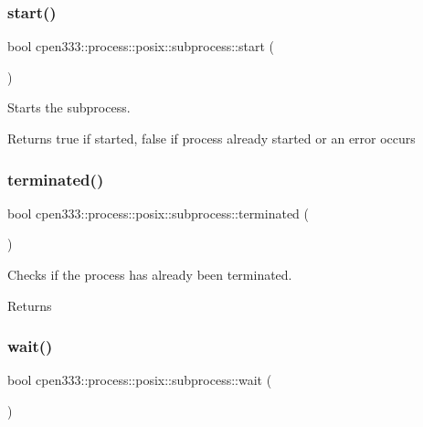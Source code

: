 \subsubsection{\texorpdfstring{start()}{start()}}
{\footnotesize\ttfamily bool cpen333\+::process\+::posix\+::subprocess\+::start (\begin{DoxyParamCaption}{ }\end{DoxyParamCaption})\hspace{0.3cm}{\ttfamily [inline]}}



Starts the subprocess. 

\begin{DoxyReturn}{Returns}
true if started, false if process already started or an error occurs 
\end{DoxyReturn}
\mbox{\label{classcpen333_1_1process_1_1posix_1_1subprocess_aabc5ed98ead25bc40663e586a83e62bb}} 
\subsubsection{\texorpdfstring{terminated()}{terminated()}}
{\footnotesize\ttfamily bool cpen333\+::process\+::posix\+::subprocess\+::terminated (\begin{DoxyParamCaption}{ }\end{DoxyParamCaption})\hspace{0.3cm}{\ttfamily [inline]}}



Checks if the process has already been terminated. 

\begin{DoxyReturn}{Returns}

\end{DoxyReturn}
\mbox{\label{classcpen333_1_1process_1_1posix_1_1subprocess_a8928b9937577c0ec288318b2176156a0}} 
\subsubsection{\texorpdfstring{wait()}{wait()}}
{\footnotesize\ttfamily bool cpen333\+::process\+::posix\+::subprocess\+::wait (\begin{DoxyParamCaption}{ }\end{DoxyParamCaption})\hspace{0.3cm}{\ttfamily [inline]}}



